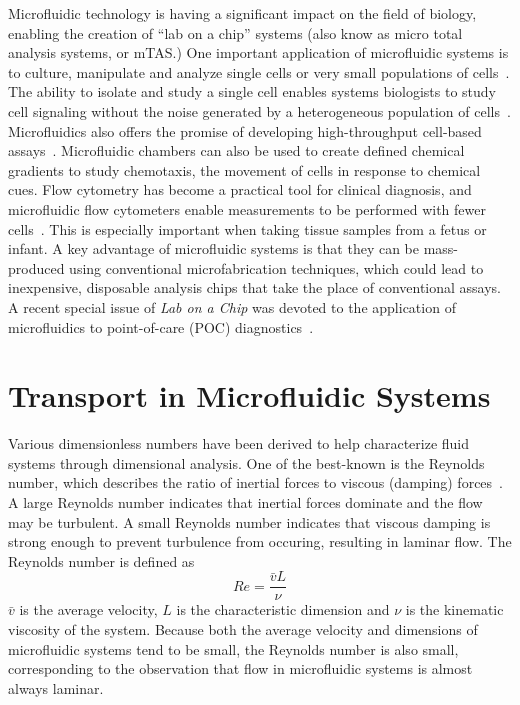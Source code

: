 Microfluidic technology is having a significant impact on the field
of biology, enabling the creation of {}``lab on a chip'' systems
(also know as micro total analysis systems, or \textgreek{m}TAS.)
One important application of microfluidic systems is to culture, manipulate
and analyze single cells or very small populations of cells~\cite{Yi2006}.
The ability to isolate and study a single cell enables systems biologists
to study cell signaling without the noise generated by a heterogeneous
population of cells~\cite{Breslauer2006}. Microfluidics also offers
the promise of developing high-throughput cell-based assays~\cite{Borland2008}.
Microfluidic chambers can also be used to create defined chemical
gradients to study chemotaxis, the movement of cells in response to
chemical cues. Flow cytometry has become a practical tool for clinical
diagnosis, and microfluidic flow cytometers enable measurements to
be performed with fewer cells~\cite{Chung2007}. This is especially
important when taking tissue samples from a fetus or infant. A key
advantage of microfluidic systems is that they can be mass-produced
using conventional microfabrication techniques, which could lead to
inexpensive, disposable analysis chips that take the place of conventional
assays. A recent special issue of \emph{Lab on a Chip} was devoted
to the application of microfluidics to point-of-care (POC) diagnostics~\cite{Sia2008}.


\section{Transport in Microfluidic Systems}

Various dimensionless numbers have been derived to help characterize
fluid systems through dimensional analysis. One of the best-known
is the Reynolds number, which describes the ratio of inertial forces
to viscous (damping) forces~\cite{fox2006}. A large Reynolds number
indicates that inertial forces dominate and the flow may be turbulent.
A small Reynolds number indicates that viscous damping is strong enough
to prevent turbulence from occuring, resulting in laminar flow. The
Reynolds number is defined as\[
Re=\frac{\bar{v}L}{\nu}\]
$\bar{v}$ is the average velocity, $L$ is the characteristic dimension
and $\nu$ is the kinematic viscosity of the system. Because both
the average velocity and dimensions of microfluidic systems tend to
be small, the Reynolds number is also small, corresponding to the
observation that flow in microfluidic systems is almost always laminar.

